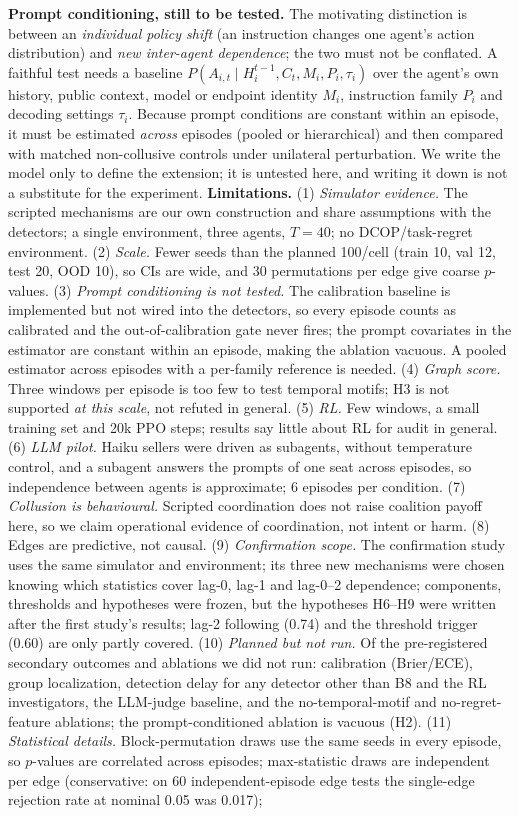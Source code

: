 \documentclass[11pt]{article}
\begin{document}
\textbf{Prompt conditioning, still to be tested.} The motivating distinction is between an \emph{individual policy shift} (an instruction changes one agent's action distribution) and \emph{new inter-agent dependence}; the two must not be conflated. A faithful test needs a baseline $P(A_{i,t}\mid H_i^{t-1},C_t,M_i,P_i,\tau_i)$ over the agent's own history, public context, model or endpoint identity $M_i$, instruction family $P_i$ and decoding settings $\tau_i$. Because prompt conditions are constant within an episode, it must be estimated \emph{across} episodes (pooled or hierarchical) and then compared with matched non-collusive controls under unilateral perturbation. We write the model only to define the extension; it is untested here, and writing it down is not a substitute for the experiment.
\textbf{Limitations.} (1) \emph{Simulator evidence.} The scripted mechanisms are our own construction and share assumptions with the detectors; a single environment, three agents, $T{=}40$; no DCOP/task-regret environment. (2) \emph{Scale.} Fewer seeds than the planned 100/cell (train 10, val 12, test 20, OOD 10), so CIs are wide, and 30 permutations per edge give coarse $p$-values. (3) \emph{Prompt conditioning is not tested.} The calibration baseline is implemented but not wired into the detectors, so every episode counts as calibrated and the out-of-calibration gate never fires; the prompt covariates in the estimator are constant within an episode, making the ablation vacuous. A pooled estimator across episodes with a per-family reference is needed. (4) \emph{Graph score.} Three windows per episode is too few to test temporal motifs; H3 is not supported \emph{at this scale}, not refuted in general. (5) \emph{RL.} Few windows, a small training set and 20k PPO steps; results say little about RL for audit in general. (6) \emph{LLM pilot.} Haiku sellers were driven as subagents, without temperature control, and a subagent answers the prompts of one seat across episodes, so independence between agents is approximate; 6 episodes per condition. (7) \emph{Collusion is behavioural.} Scripted coordination does not raise coalition payoff here, so we claim operational evidence of coordination, not intent or harm. (8) Edges are predictive, not causal. (9) \emph{Confirmation scope.} The confirmation study uses the same simulator and environment; its three new mechanisms were chosen knowing which statistics cover lag-0, lag-1 and lag-0--2 dependence; components, thresholds and hypotheses were frozen, but the hypotheses H6--H9 were written after the first study's results; lag-2 following (0.74) and the threshold trigger (0.60) are only partly covered. (10) \emph{Planned but not run.} Of the pre-registered secondary outcomes and ablations we did not run: calibration (Brier/ECE), group localization, detection delay for any detector other than B8 and the RL investigators, the LLM-judge baseline, and the no-temporal-motif and no-regret-feature ablations; the prompt-conditioned ablation is vacuous (H2). (11) \emph{Statistical details.} Block-permutation draws use the same seeds in every episode, so $p$-values are correlated across episodes; max-statistic draws are independent per edge (conservative: on 60 independent-episode edge tests the single-edge rejection rate at nominal 0.05 was 0.017); 
\end{document}
